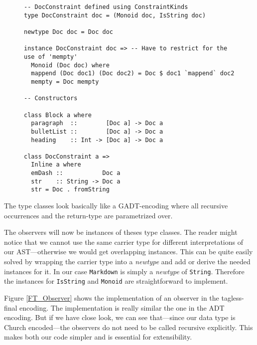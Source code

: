 \begin{figure}
\begin{lstlisting}
-- DocConstraint defined using ConstraintKinds
type DocConstraint doc = (Monoid doc, IsString doc)

newtype Doc doc = Doc doc

instance DocConstraint doc => -- Have to restrict for the use of 'mempty'
  Monoid (Doc doc) where
  mappend (Doc doc1) (Doc doc2) = Doc $ doc1 `mappend` doc2
  mempty = Doc mempty

-- Constructors

class Block a where
  paragraph  ::        [Doc a] -> Doc a
  bulletList ::        [Doc a] -> Doc a
  heading    :: Int -> [Doc a] -> Doc a

class DocConstraint a =>
  Inline a where
  emDash ::           Doc a
  str    :: String -> Doc a
  str = Doc . fromString
\end{lstlisting}
\end{figure}

The type classes look basically like a GADT-encoding where all recursive
occurrences and the return-type are parametrized over.

The observers will now be instances of theses type classes. The reader might
notice that we cannot use the same carrier type for different interpretations of
our AST—otherwise we would get overlapping instances. This can be quite easily
solved by wrapping the carrier type into a \emph{newtype} and add or derive the
needed instances for it. In our case \texttt{Markdown} is simply a
\emph{newtype} of \texttt{String}. Therefore the instances for \texttt{IsString}
and \texttt{Monoid} are straightforward to implement.

Figure \ref{FT_Observer} shows the implementation of an observer in the
tagless-final encoding. The implementation is really similar the one in the ADT
encoding. But if we have close look, we can see that—since our data type is
Church encoded—the observers do not need to be called recursive explicitly. This
makes both our code simpler and is essential for extensibility.

